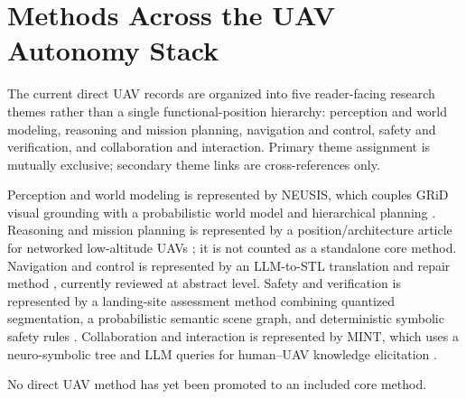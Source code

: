 \section{Methods Across the UAV Autonomy Stack}

The current direct UAV records are organized into five reader-facing research
themes rather than a single functional-position hierarchy: perception and
world modeling, reasoning and mission planning, navigation and control, safety
and verification, and collaboration and interaction. Primary theme assignment
is mutually exclusive; secondary theme links are cross-references only.

Perception and world modeling is represented by NEUSIS, which couples GRiD
visual grounding with a probabilistic world model and hierarchical planning
\cite{p_2409_10196}. Reasoning and mission planning is represented by a
position/architecture article for networked low-altitude UAVs
\cite{p_2609_19961}; it is not counted as a standalone core method. Navigation
and control is represented by an LLM-to-STL translation and repair method
\cite{p_2603_27583}, currently reviewed at abstract level. Safety and
verification is represented by a landing-site assessment method combining
quantized segmentation, a probabilistic semantic scene graph, and
deterministic symbolic safety rules \cite{p_2607_02277}. Collaboration and
interaction is represented by MINT, which uses a neuro-symbolic tree and LLM
queries for human--UAV knowledge elicitation \cite{p_2603_07824}.

No direct UAV method has yet been promoted to an included core method.
